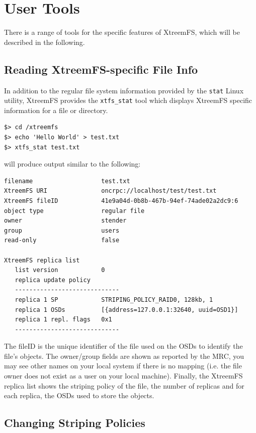 \documentclass[a4paper,10pt]{book}
\begin{document}
\section{User Tools}

There is a range of tools for the specific features of XtreemFS, which will be described in the following.

\subsection{Reading XtreemFS-specific File Info}

In addition to the regular file system information provided by the \texttt{stat} Linux utility, XtreemFS provides the \texttt{xtfs\_stat} tool which displays XtreemFS specific information for a file or directory.


\begin{verbatim}
$> cd /xtreemfs
$> echo 'Hello World' > test.txt
$> xtfs_stat test.txt
\end{verbatim}


will produce output similar to the following:


\begin{verbatim}
filename                   test.txt
XtreemFS URI               oncrpc://localhost/test/test.txt
XtreemFS fileID            41e9a04d-0b8b-467b-94ef-74ade02a2dc9:6
object type                regular file
owner                      stender
group                      users
read-only                  false

XtreemFS replica list
   list version            0
   replica update policy
   -----------------------------
   replica 1 SP            STRIPING_POLICY_RAID0, 128kb, 1
   replica 1 OSDs          [{address=127.0.0.1:32640, uuid=OSD1}]
   replica 1 repl. flags   0x1
   -----------------------------
\end{verbatim}


The fileID  is the unique identifier of the file used on the OSDs to identify the file's objects. The owner/group fields are shown as reported by the MRC, you may see other names on your local system if there is no mapping (i.e. the file owner does not exist as a user on your local machine).
Finally, the XtreemFS replica list shows the striping policy of the file, the number of replicas and for each replica, the OSDs used to store the objects.


\subsection{Changing Striping Policies}
\end{document}
